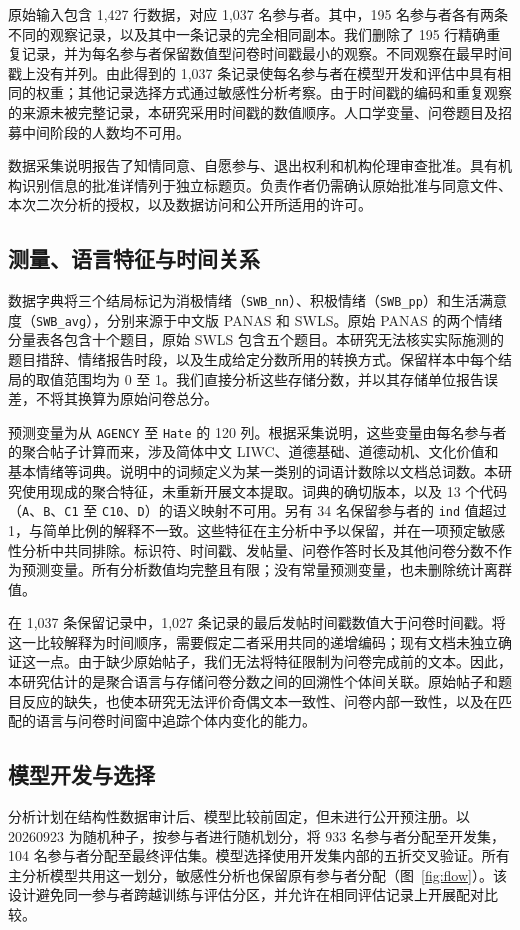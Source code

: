 原始输入包含 1,427 行数据，对应 1,037 名参与者。其中，195 名参与者各有两条不同的观察记录，以及其中一条记录的完全相同副本。我们删除了 195 行精确重复记录，并为每名参与者保留数值型问卷时间戳最小的观察。不同观察在最早时间戳上没有并列。由此得到的 1,037 条记录使每名参与者在模型开发和评估中具有相同的权重；其他记录选择方式通过敏感性分析考察。由于时间戳的编码和重复观察的来源未被完整记录，本研究采用时间戳的数值顺序。人口学变量、问卷题目及招募中间阶段的人数均不可用。

数据采集说明报告了知情同意、自愿参与、退出权利和机构伦理审查批准。具有机构识别信息的批准详情列于独立标题页。负责作者仍需确认原始批准与同意文件、本次二次分析的授权，以及数据访问和公开所适用的许可。

\subsection{测量、语言特征与时间关系}
数据字典将三个结局标记为消极情绪（\texttt{SWB\_nn}）、积极情绪（\texttt{SWB\_pp}）和生活满意度（\texttt{SWB\_avg}），分别来源于中文版 PANAS 和 SWLS。原始 PANAS 的两个情绪分量表各包含十个题目，原始 SWLS 包含五个题目\citep{diener1985,watson1988}。本研究无法核实实际施测的题目措辞、情绪报告时段，以及生成给定分数所用的转换方式。保留样本中每个结局的取值范围均为 0 至 1。我们直接分析这些存储分数，并以其存储单位报告误差，不将其换算为原始问卷总分。

预测变量为从 \texttt{AGENCY} 至 \texttt{Hate} 的 120 列。根据采集说明，这些变量由每名参与者的聚合帖子计算而来，涉及简体中文 LIWC、道德基础、道德动机、文化价值和基本情绪等词典。说明中的词频定义为某一类别的词语计数除以文档总词数。本研究使用现成的聚合特征，未重新开展文本提取。词典的确切版本，以及 13 个代码（\texttt{A}、\texttt{B}、\texttt{C1} 至 \texttt{C10}、\texttt{D}）的语义映射不可用。另有 34 名保留参与者的 \texttt{ind} 值超过 1，与简单比例的解释不一致。这些特征在主分析中予以保留，并在一项预定敏感性分析中共同排除。标识符、时间戳、发帖量、问卷作答时长及其他问卷分数不作为预测变量。所有分析数值均完整且有限；没有常量预测变量，也未删除统计离群值。

在 1,037 条保留记录中，1,027 条记录的最后发帖时间戳数值大于问卷时间戳。将这一比较解释为时间顺序，需要假定二者采用共同的递增编码；现有文档未独立确证这一点。由于缺少原始帖子，我们无法将特征限制为问卷完成前的文本。因此，本研究估计的是聚合语言与存储问卷分数之间的回溯性个体间关联。原始帖子和题目反应的缺失，也使本研究无法评价奇偶文本一致性、问卷内部一致性，以及在匹配的语言与问卷时间窗中追踪个体内变化的能力。

\subsection{模型开发与选择}
分析计划在结构性数据审计后、模型比较前固定，但未进行公开预注册。以 20260923 为随机种子，按参与者进行随机划分，将 933 名参与者分配至开发集，104 名参与者分配至最终评估集。模型选择使用开发集内部的五折交叉验证。所有主分析模型共用这一划分，敏感性分析也保留原有参与者分配（图~\ref{fig:flow}）。该设计避免同一参与者跨越训练与评估分区，并允许在相同评估记录上开展配对比较。

